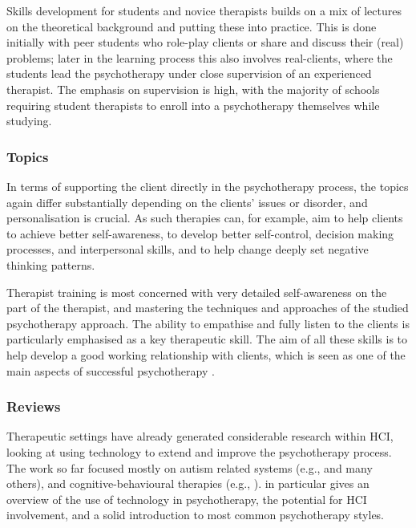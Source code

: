 \documentclass[prodmode,acmtochi]{acmsmall}
\newcommand{\todo}[1]{\textrm{\textrm{\textcolor{LightBlue}{[[#1]]}}}}
\newcommand{\GeraldineFIX}[1]{}
\begin{document}
\GeraldineFIX{G: add in a sentence or two to give an autism review ... P: This is about methods so the review should be probably rather below (or in topics). Moreover, I do not want to get into all kinds of methods to autism training (and I do not have a good review I would trust to be non-controversial at the moment)}


Skills development for students and novice therapists builds on a mix of lectures on the theoretical background and putting these into practice. This is done initially with peer students who role-play clients or share and discuss their (real) problems; later in the learning process this also involves real-clients, where the students lead the psychotherapy under close supervision of an experienced therapist. The emphasis on supervision is high, with the majority of schools requiring student therapists to enroll into a psychotherapy themselves while studying. 


\subsubsection*{Topics} 
In terms of supporting the client directly in the psychotherapy process, the topics again differ substantially depending on the clients' issues or disorder, and personalisation is crucial. As such therapies can, for example, aim to help clients to achieve better self-awareness, to develop better  self-control, decision making processes, and interpersonal skills, and to help change deeply set negative thinking patterns.  %

Therapist training is most concerned with very detailed self-awareness on the part of the therapist, and mastering the techniques and approaches of the studied psychotherapy approach. The ability to empathise and fully listen to the clients is particularly emphasised as a key therapeutic skill. The aim of all these skills is to help develop a good working relationship with clients, which is seen as one of the main aspects of successful psychotherapy \cite{Asay1999}.

\subsubsection*{Reviews}
Therapeutic settings have already generated considerable research within
HCI,  looking at using technology to extend and improve the psychotherapy process.
The work so far focused mostly on autism related systems (e.g.,
\cite{Escobedo2012,Picard2009,Hayes2011,Porayska-Pomsta2011,Hong2012} and many others), and cognitive-behavioural therapies (e.g., \cite{Coyle2011,Matthews2011}).  in particular gives an overview of the use of technology in psychotherapy, the potential for HCI involvement, and a solid introduction to most common psychotherapy styles.          
\end{document}
